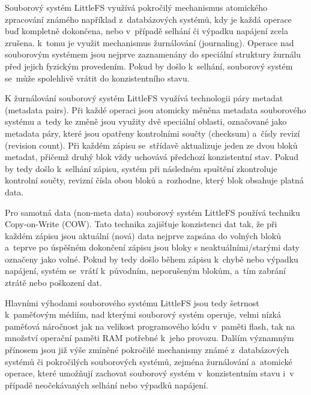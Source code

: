 
Souborový systém LittleFS využívá pokročilý mechanismus atomického zpracování známého například z~databázových systémů, kdy je každá operace buď kompletně dokončena, nebo v~případě selhání či výpadku napájení zcela zrušena. k~tomu je využit mechanismus žurnálování (journaling). Operace nad souborovým systémem jsou nejprve zaznamenány do speciální struktury žurnálu před jejich fyzickým provedením. Pokud by došlo k~selhání, souborový systém se~může spolehlivě vrátit do konzistentního stavu.~\cite{nxp_the_design_of_the_little_filesystem}

K žurnálování souborový systém LittleFS využívá technologii páry metadat (metadata pairs). Při každé operaci jsou atomicky měněna metadata souborového systému a~tedy ke změně jsou využity dvě speciální oblasti, označované jako metadata páry, které jsou opatřeny kontrolními součty (checksum) a~čísly revizí (revision count). Při každém zápisu se~střídavě aktualizuje jeden ze dvou bloků metadat, přičemž druhý blok vždy uchovává předchozí konzistentní stav. Pokud by tedy došlo k~selhání zápisu, systém při následném spuštění zkontroluje kontrolní součty, revizní čísla obou bloků a~rozhodne, který blok obsahuje platná data.~\cite{nxp_the_design_of_the_little_filesystem}

Pro samotná data (non-meta data) souborový systém LittleFS používá techniku Copy-on-Write (COW). Tato technika zajišťuje konzistenci dat tak, že při každém zápisu jsou aktuální (nová) data nejprve zapsána do volných bloků a~teprve po úspěšném dokončení zápisu jsou bloky s neaktuálními/starými daty označeny jako volné. Pokud by tedy došlo během zápisu k~chybě nebo výpadku napájení, systém se~vrátí k~původním, neporušeným blokům, a~tím zabrání ztrátě nebo poškození dat.~\cite{nxp_the_design_of_the_little_filesystem}

Hlavními výhodami souborového systému LittleFS jsou tedy šetrnost k~paměťovým médiím, nad kterými souborový systém operuje, velmi nízká paměťová náročnost jak na velikost programového kódu v~paměti flash, tak na množství operační paměti RAM potřebné k~jeho provozu. Dalším významným přínosem jsou již výše zmíněné pokročilé mechanismy známé z~databázových systémů či pokročilých souborových systémů, zejména žurnálování a~atomické operace, které umožňují zachovat souborový systém v~konzistentním stavu i~v případě neočekávaných selhání nebo výpadků napájení.~\cite{nxp_the_design_of_the_little_filesystem}

